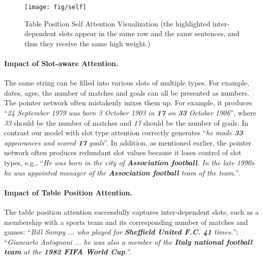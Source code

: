 \documentclass[11pt,a4paper]{article}
\begin{document}
\begin{figure*}[!htb]
\centering
\texttt{[image: fig/self]}
\vspace{-10mm}
\caption{Table Position Self Attention Visualization (the highlighted inter-dependent slots appear in the same row and the same sentences, and thus they receive the same high weight.)}
\label{fig:self}
\end{figure*}


\paragraph{Impact of Slot-aware Attention.} The same string can be filled into various slots of multiple types. For example, dates, ages, the number of matches and goals can all be presented as numbers. The pointer network often mistakenly mixes them up. For example, it produces ``\emph{24 September 1979 was born 3 October 1903 in \textbf{17} on \textbf{33} October 1906}'', where \textit{33} should be the number of matches and \textit{17} should be the number of goals. In contrast our model with slot type attention correctly generates ``\emph{he made \textbf{33} appearances and scored \textbf{17} goals}''. In addition, as mentioned earlier, the pointer network often produces redundant slot values because it loses control of slot types, e.g., ``\emph{He was born in the city of \textbf{Association football}. In the late 1990s he was appointed manager of the \textbf{Association football} team of the team.}''. 

\paragraph{Impact of Table Position Attention.} The table position attention successfully captures inter-dependent slots, such as a membership with a sports team and its corresponding number of matches and games: ``\emph{Bill Sampy ... who played for \textbf{Sheffield United F.C.} \textbf{41} times.}''; ``\emph{Giancarlo Antognoni ... he was also a member of the \textbf{Italy national football team} at the \textbf{1982 FIFA World Cup}.}''.
\end{document}
